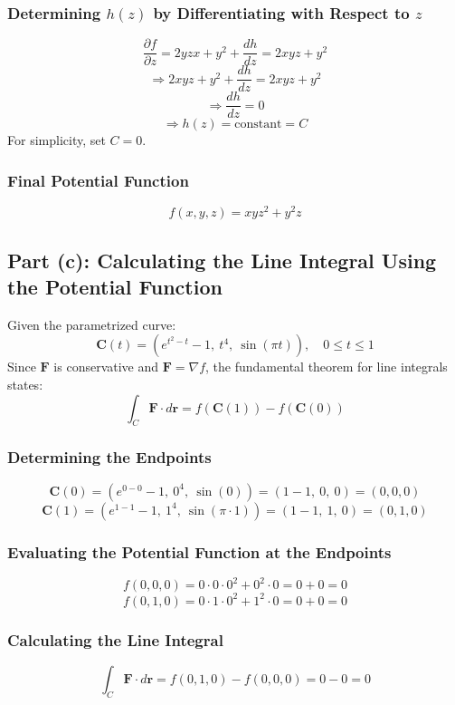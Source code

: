 \documentclass[11pt]{article}
\begin{document}
\subsubsection*{Determining \( h(z) \) by Differentiating with Respect to \( z \)}
\[
\frac{\partial f}{\partial z} = 2 y z x + y^2 + \frac{dh}{dz} = 2 x y z + y^2
\]
\[
\Rightarrow 2 x y z + y^2 + \frac{dh}{dz} = 2 x y z + y^2
\]
\[
\Rightarrow \frac{dh}{dz} = 0
\]
\[
\Rightarrow h(z) = \text{constant} = C
\]
For simplicity, set \( C = 0 \).

\subsubsection*{Final Potential Function}
\[
\boxed{ f(x, y, z) = x y z^2 + y^2 z }
\]

\newpage

\subsection{Part (c): Calculating the Line Integral Using the Potential Function}

Given the parametrized curve:
\[
\mathbf{C}(t) = \left( e^{t^2 - t} - 1, \ t^4, \ \sin(\pi t) \right), \quad 0 \leq t \leq 1
\]
Since \( \mathbf{F} \) is conservative and \( \mathbf{F} = \nabla f \), the fundamental theorem for line integrals states:
\[
\int_{C} \mathbf{F} \cdot d\mathbf{r} = f(\mathbf{C}(1)) - f(\mathbf{C}(0))
\]

\subsubsection*{Determining the Endpoints}
\[
\mathbf{C}(0) = \left( e^{0 - 0} - 1, \ 0^4, \ \sin(0) \right) = (1 - 1, \ 0, \ 0) = (0, 0, 0)
\]
\[
\mathbf{C}(1) = \left( e^{1 - 1} - 1, \ 1^4, \ \sin(\pi \cdot 1) \right) = (1 - 1, \ 1, \ 0) = (0, 1, 0)
\]

\subsubsection*{Evaluating the Potential Function at the Endpoints}
\[
f(0, 0, 0) = 0 \cdot 0 \cdot 0^2 + 0^2 \cdot 0 = 0 + 0 = 0
\]
\[
f(0, 1, 0) = 0 \cdot 1 \cdot 0^2 + 1^2 \cdot 0 = 0 + 0 = 0
\]

\subsubsection*{Calculating the Line Integral}
\[
\int_{C} \mathbf{F} \cdot d\mathbf{r} = f(0, 1, 0) - f(0, 0, 0) = 0 - 0 = 0
\]
\end{document}
